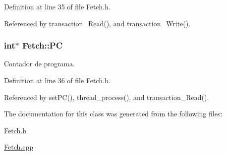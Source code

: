 Definition at line 35 of file Fetch.\+h.



Referenced by transaction\+\_\+\+Read(), and transaction\+\_\+\+Write().

\hypertarget{classFetch_a843f7a6498d7c4049751f8e7267f6609}{
\subsubsection[{P\+C}]{\setlength{\rightskip}{0pt plus 5cm}int$\ast$ Fetch\+::\+P\+C\hspace{0.3cm}{\ttfamily [private]}}}\label{classFetch_a843f7a6498d7c4049751f8e7267f6609}
Contador de programa. 

Definition at line 36 of file Fetch.\+h.



Referenced by set\+P\+C(), thread\+\_\+process(), and transaction\+\_\+\+Read().



The documentation for this class was generated from the following files\+:\begin{DoxyCompactItemize}
\item 
\hyperlink{Fetch_8h}{Fetch.\+h}\item 
\hyperlink{Fetch_8cpp}{Fetch.\+cpp}\end{DoxyCompactItemize}
